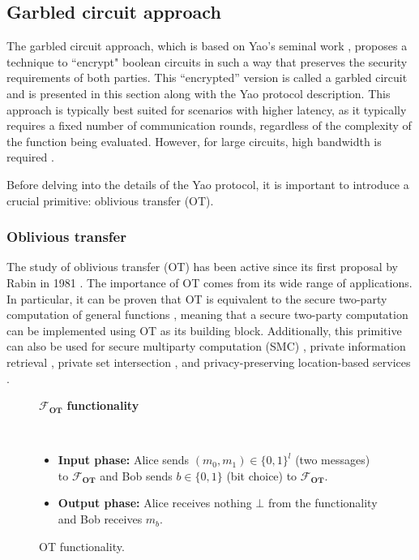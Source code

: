 \subsection{Garbled circuit approach}

The garbled circuit approach, which is based on Yao's seminal work \cite{Yao82}, proposes a technique to ``encrypt" boolean circuits in such a way that preserves the security requirements of both parties. This ``encrypted'' version is called a garbled circuit and is presented in this section along with the Yao protocol description. This approach is typically best suited for scenarios with higher latency, as it typically requires a fixed number of communication rounds, regardless of the complexity of the function being evaluated. However, for large circuits, high bandwidth is required \cite{PWM+20}.

Before delving into the details of the Yao protocol, it is important to introduce a crucial primitive: oblivious transfer (OT).

\subsubsection{Oblivious transfer}

The study of oblivious transfer (OT) has been active since its first proposal by Rabin in 1981 \cite{Rabin81}. The importance of OT comes from its wide range of applications. In particular, it can be proven that OT is equivalent to the secure two-party computation of general functions \cite{Y86, K88}, meaning that a secure two-party computation can be implemented using OT as its building block. Additionally, this primitive can also be used for secure multiparty computation (SMC) \cite{KOS16}, private information retrieval \cite{Che04}, private set intersection \cite{MEP17}, and privacy-preserving location-based services \cite{BHM+19}.

\begin{figure}[h!]
\centering
\begin{tcolorbox}
                        
    \centerline{$\mathcal{F}_{\textbf{OT}}$ \textbf{functionality}}
            
    \
    
    \begin{itemize}
    		\item \textbf{Input phase:} Alice sends $(m_0, m_1)\in\{0,1\}^l$ (two messages) to $\mathcal{F}_{\textbf{OT}}$ and Bob sends $b\in\{0,1\}$ (bit choice) to $\mathcal{F}_{\textbf{OT}}$.
    		\item \textbf{Output phase:} Alice receives nothing $\bot$ from the functionality and Bob receives $m_b$.
    \end{itemize}
    
\end{tcolorbox} 
    \caption{OT functionality.}
    \label{fig:OT_functionality}
\end{figure}

